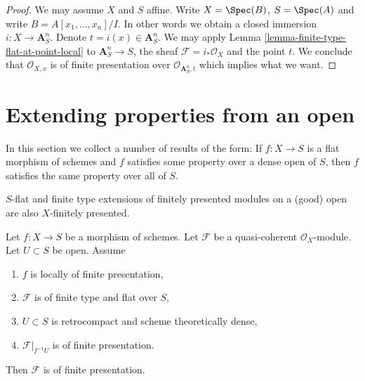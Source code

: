 \begin{proof}
We may assume $X$ and $S$ affine. Write $X = \Spec(B)$,
$S = \Spec(A)$ and write $B = A[x_1, \ldots, x_n]/I$.
In other words we obtain a closed immersion $i : X \to \mathbf{A}^n_S$.
Denote $t = i(x) \in \mathbf{A}^n_S$. We may apply
Lemma \ref{lemma-finite-type-flat-at-point-local}
to $\mathbf{A}^n_S \to S$, the sheaf $\mathcal{F} = i_*\mathcal{O}_X$
and the point $t$. We conclude that $\mathcal{O}_{X, x}$ is
of finite presentation over $\mathcal{O}_{\mathbf{A}^n_S, t}$
which implies what we want.
\end{proof}







\section{Extending properties from an open}
\label{section-extending-properties}

\noindent
In this section we collect a number of results of the form: If $f : X \to S$
is a flat morphism of schemes and $f$ satisfies some property over a dense
open of $S$, then $f$ satisfies the same property over all of $S$.

\begin{lemma}
\label{lemma-flat-finite-type-finitely-presented-over-dense-open}
\begin{slogan}
$S$-flat and finite type extensions of finitely presented modules
on a (good) open are also $X$-finitely presented.
\end{slogan}
Let $f : X \to S$ be a morphism of schemes. Let $\mathcal{F}$ be a
quasi-coherent $\mathcal{O}_X$-module. Let $U \subset S$ be open.
Assume
\begin{enumerate}
\item $f$ is locally of finite presentation,
\item $\mathcal{F}$ is of finite type and flat over $S$,
\item $U \subset S$ is retrocompact and scheme theoretically dense,
\item $\mathcal{F}|_{f^{-1}U}$ is of finite presentation.
\end{enumerate}
Then $\mathcal{F}$ is of finite presentation.
\end{lemma}

